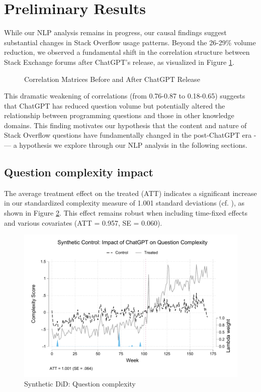 \section{Preliminary Results}
While our NLP analysis remains in progress, our causal findings suggest substantial changes in Stack Overflow usage patterns. Beyond the 26-29\% volume reduction, we observed a fundamental shift in the correlation structure between Stack Exchange forums after ChatGPT's release, as visualized in Figure \ref{fig:correlation_matrix}.

\begin{figure}[htpb!]
    \centering
    
    \caption{Correlation Matrices Before and After ChatGPT Release}
    \label{fig:correlation_matrix}
\end{figure}

This dramatic weakening of correlations (from 0.76-0.87 to 0.18-0.65) suggests that ChatGPT has reduced question volume but potentially altered the relationship between programming questions and those in other knowledge domains. This finding motivates our hypothesis that the content and nature of Stack Overflow questions have fundamentally changed in the post-ChatGPT era -— a hypothesis we explore through our NLP analysis in the following sections.


\subsection{Question complexity impact}

The average treatment effect on the treated (ATT) indicates a significant increase in our standardized complexity measure of 1.001 standard deviations (cf. ), as shown in Figure \ref{fig:cscore_synthetic_control}. This effect remains robust when including time-fixed effects and various covariates (ATT = 0.957, SE = 0.060).  

\begin{figure}[H]
    \centering
    \includegraphics[width=1\linewidth]{imgs/stata/sdid_nlp_trends102.pdf}
    \caption{Synthetic DiD: Question complexity}
    \label{fig:cscore_synthetic_control}
\end{figure}


